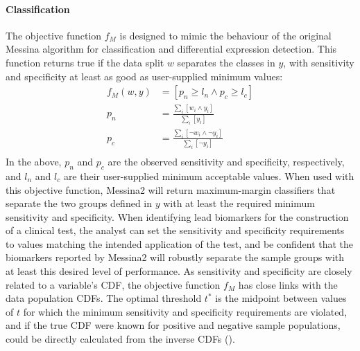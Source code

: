\documentclass[dissertation.tex]{subfiles}
\begin{document}
\paragraph{Classification}
The objective function $f_M$ is designed to mimic the behaviour of the original Messina algorithm for classification and differential expression detection.  This function returns $\mathrm{true}$ if the data split $w$ separates the classes in $y$, with sensitivity and specificity at least as good as user-supplied minimum values:
\begin{align*}
f_M(w, y) &= \left[ p_n \geq l_n \wedge p_c \geq l_c \right] \\
p_n &= \frac{\sum_i{\left[ w_i \wedge y_i \right]}}{\sum_i{\left[ y_i \right]}} \\
p_c &= \frac{\sum_i{\left[ \neg w_i \wedge \neg y_i \right]}}{\sum_i{\left[ \neg y_i \right]}} \\
\end{align*}
In the above, $p_n$ and $p_c$ are the observed sensitivity and specificity, respectively, and $l_n$ and $l_c$ are their user-supplied minimum acceptable values.  When used with this objective function, Messina2 will return maximum-margin classifiers that separate the two groups defined in $y$ with at least the required minimum sensitivity and specificity.  When identifying lead biomarkers for the construction of a clinical test, the analyst can set the sensitivity and specificity requirements to values matching the intended application of the test, and be confident that the biomarkers reported by Messina2 will robustly separate the sample groups with at least this desired level of performance.  As sensitivity and specificity are closely related to a variable's \gls{CDF}, the objective function $f_M$ has close links with the data population \glspl{CDF}.  The optimal threshold $t^*$ is the midpoint between values of $t$ for which the minimum sensitivity and specificity requirements are violated, and if the true \gls{CDF} were known for positive and negative sample populations, could be directly calculated from the inverse \glspl{CDF} ().
\end{document}
